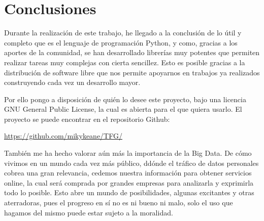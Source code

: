 
\chapter{Conclusiones}

Durante la realización de este trabajo, he llegado a la conclusión de lo útil y completo que es el lenguaje de programación Python, y como, gracias a los aportes de la comunidad, se han desarrollado librerías muy potentes que permiten realizar tareas muy complejas con cierta sencillez. Esto es posible gracias a la distribución de software libre que nos permite apoyarnos en trabajos ya realizados construyendo cada vez un desarrollo mayor.

Por ello pongo a disposición de quién lo desee este proyecto, bajo una licencia GNU General Public License, la cual es abierta para el que quiera usarlo. El proyecto se puede encontrar en el repositorio Github: 

\href{https://github.com/mikykeane/TFG/}{https://github.com/mikykeane/TFG/}


También me ha hecho valorar aún más la importancia de la Big Data. De cómo vivimos en un mundo cada vez más público, ddónde el tráfico de datos personales cobrea una gran relevancia, cedemos nuestra información para obtener servicios online, la cual será comprada por grandes empresas para analizarla y exprimirla todo lo posible. Esto abre un mundo de posibilidades, algunas excitantes y otras aterradoras, pues el progreso en sí no es ni bueno ni malo, solo el uso que hagamos del mismo puede estar sujeto a la moralidad. 